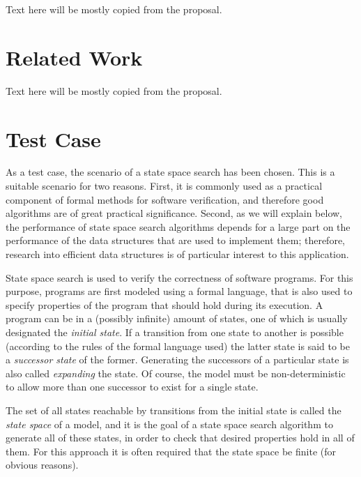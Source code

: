 \documentclass{acm_proc_article-sp}
\begin{document}


Text here will be mostly copied from the proposal.

\section{Related Work}

Text here will be mostly copied from the proposal.

\section{Test Case}
As a test case, the scenario of a state space search has been chosen. This is a
suitable scenario for two reasons. First, it is commonly used as a practical
component of formal methods for software verification, and therefore good
algorithms are of great practical significance. Second, as we will explain
below, the performance of state space search algorithms depends for a large
part on the performance of the data structures that are used to implement
them; therefore, research into efficient data structures is of particular
interest to this application.

State space search is used to verify the correctness of software programs. For
this purpose, programs are first modeled using a formal language, that is also
used to specify properties of the program that should hold during its
execution. A program can be in a (possibly infinite) amount of states, one of
which is usually designated the \emph{initial state}. If a transition from one
state to another is possible (according to the rules of the formal language
used) the latter state is said to be a \emph{successor state} of the former.
Generating the successors of a particular state is also called
\emph{expanding} the state. Of course, the model must be non-deterministic to
allow more than one successor to exist for a single state.

The set of all states reachable by transitions from the initial state is called
the \emph{state space} of a model, and it is the goal of a state space search
algorithm to generate all of these states, in order to check that desired
properties hold in all of them. For this approach it is often required that
the state space be finite (for obvious reasons).
\end{document}
